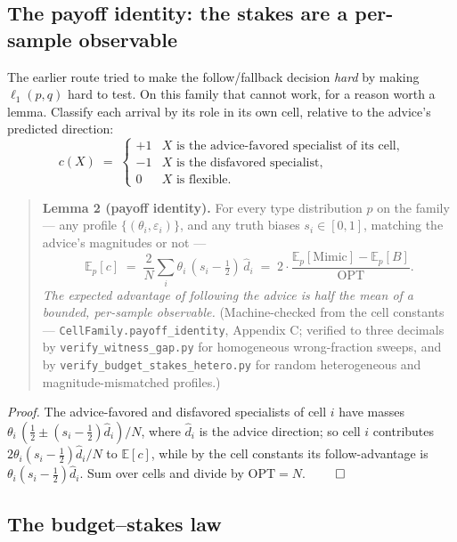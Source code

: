 \subsection{The payoff identity: the stakes are a per-sample
observable}

The earlier route tried to make the follow/fallback decision \emph{hard}
by making \(\ell_1(p,q)\) hard to test. On this family that cannot work,
for a reason worth a lemma. Classify each arrival by its role in its own
cell, relative to the advice's predicted direction:
\[c(X) \;=\; \begin{cases} +1 & X \text{ is the advice-favored specialist of its cell,} \\
-1 & X \text{ is the disfavored specialist,} \\ 0 & X \text{ is flexible.}\end{cases}\]

\begin{quote}
\textbf{Lemma 2 (payoff identity).} For every type distribution \(p\) on
the family --- any profile \(\{(\theta_i,\varepsilon_i)\}\), and any
truth biases \(s_i\in[0,1]\), matching the advice's magnitudes or not
---
\[\mathbb E_p[c] \;=\; \frac2N\sum_i \theta_i\,(s_i-\tfrac12)\,\hat d_i
\;=\; 2\cdot\frac{\mathbb E_p[\mathrm{Mimic}]-\mathbb E_p[B]}{\mathrm{OPT}}.\]
\emph{The expected advantage of following the advice is half the mean of
a bounded, per-sample observable.} (Machine-checked from the cell
constants --- \texttt{CellFamily.payoff\_identity}, Appendix C; verified
to three decimals by \texttt{verify\_witness\_gap.py} for homogeneous
wrong-fraction sweeps, and by \texttt{verify\_budget\_stakes\_hetero.py}
for random heterogeneous and magnitude-mismatched profiles.)
\end{quote}

\emph{Proof.} The advice-favored and disfavored specialists of cell
\(i\) have masses \(\theta_i\,(\tfrac12\pm(s_i-\tfrac12)\hat d_i)/N\),
where \(\hat d_i\) is the advice direction; so cell \(i\) contributes
\(2\theta_i(s_i-\tfrac12)\hat d_i/N\) to \(\mathbb E[c]\), while by the
cell constants its follow-advantage is
\(\theta_i(s_i-\tfrac12)\hat d_i\). Sum over cells and divide by
\(\mathrm{OPT}=N\). \(\qed\)

\subsection{The budget--stakes law}

